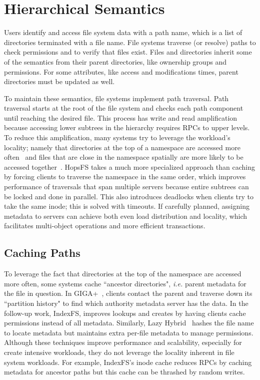 \section{Hierarchical Semantics}

Users identify and access file system data with a path name, which is a list of
directories terminated with a file name.  File systems traverse (or resolve)
paths to check permissions and to verify that files exist. Files and
directories inherit some of the semantics from their parent directories, like
ownership groups and permissions. For some attributes, like access and
modifications times, parent directories must be updated as well. 

To maintain these semantics, file systems implement path traversal. Path
traversal starts at the root of the file system and checks each path component
until reaching the desired file. This process has write and read amplification
because accessing lower subtrees in the hierarchy requires RPCs to upper
levels. To reduce this amplification, many systems try to leverage the
workload's locality; namely that directories at the top of a namespace are
accessed more often~\cite{ren:sc2014-indexfs} and files that are close in the
namespace spatially are more likely to be accessed
together~\cite{weil:osdi2006-ceph, weil:sc2004-dyn-metadata}.  HopsFS takes a
much more specialized approach than caching by forcing clients to traverse the
namespace in the same order, which improves performance of traversals that span
multiple servers because entire subtrees can be locked and done in parallel.
This also introduces deadlocks when clients try to take the same inode; this is
solved with timeouts.  If carefully planned, assigning metadata to servers can
achieve both even load distribution and locality, which facilitates
multi-object operations and more efficient transactions.

\subsection{Caching Paths}

To leverage the fact that directories at the top of the namespace are accessed
more often, some systems cache ``ancestor directories", {\it i.e.} parent
metadata for the file in question.  In GIGA+~\cite{patil:fast2011-giga+},
clients contact the parent and traverse down its ``partition history" to find
which authority metadata server has the data.  In the follow-up work, IndexFS,
improves lookups and creates by having clients cache permissions instead of all
metadata.  Similarly, Lazy Hybrid~\cite{brandt:msst2003-lh} hashes the file
name to locate metadata but maintains extra per-file metadata to manage
permissions.  Although these techniques improve performance and scalability,
especially for create intensive workloads, they do not leverage the locality
inherent in file system workloads.  For example, IndexFS's inode cache reduces
RPCs by caching metadata for ancestor paths but this cache can be thrashed by
random writes.

